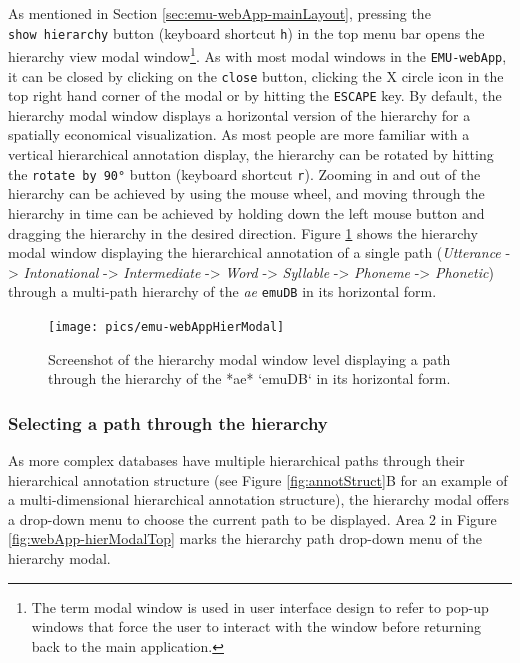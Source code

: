 \documentclass[]{book}
\begin{document}
As mentioned in Section \ref{sec:emu-webApp-mainLayout}, pressing the \texttt{show\ hierarchy} button (keyboard shortcut \texttt{h}) in the top menu bar opens the hierarchy view modal window\footnote{The term modal window is used in user interface design to refer to pop-up windows that force the user to interact with the window before returning back to the main application.}. As with most modal windows in the \texttt{EMU-webApp}, it can be closed by clicking on the \texttt{close} button, clicking the X circle icon in the top right hand corner of the modal or by hitting the \texttt{ESCAPE} key. By default, the hierarchy modal window displays a horizontal version of the hierarchy for a spatially economical visualization. As most people are more familiar with a vertical hierarchical annotation display, the hierarchy can be rotated by hitting the \texttt{rotate\ by\ 90°} button (keyboard shortcut \texttt{r}). Zooming in and out of the hierarchy can be achieved by using the mouse wheel, and moving through the hierarchy in time can be achieved by holding down the left mouse button and dragging the hierarchy in the desired direction. Figure \ref{fig:webApp-hierModal} shows the hierarchy modal window displaying the hierarchical annotation of a single path (\emph{Utterance} -\textgreater{} \emph{Intonational} -\textgreater{} \emph{Intermediate} -\textgreater{} \emph{Word} -\textgreater{} \emph{Syllable} -\textgreater{} \emph{Phoneme} -\textgreater{} \emph{Phonetic}) through a multi-path hierarchy of the \emph{ae} \texttt{emuDB} in its horizontal form.

\begin{figure}

{\centering \texttt{[image: pics/emu-webAppHierModal]} 

}

\caption{Screenshot of the hierarchy modal window level displaying a path through the hierarchy of the *ae* `emuDB` in its horizontal form.}\label{fig:webApp-hierModal}
\end{figure}

\hypertarget{selecting-a-path-through-the-hierarchy}{%
\subsubsection*{Selecting a path through the hierarchy}\label{selecting-a-path-through-the-hierarchy}}

As more complex databases have multiple hierarchical paths through their hierarchical annotation structure (see Figure \ref{fig:annotStruct}B for an example of a multi-dimensional hierarchical annotation structure), the hierarchy modal offers a drop-down menu to choose the current path to be displayed. Area 2 in Figure \ref{fig:webApp-hierModalTop} marks the hierarchy path drop-down menu of the hierarchy modal.
\end{document}

